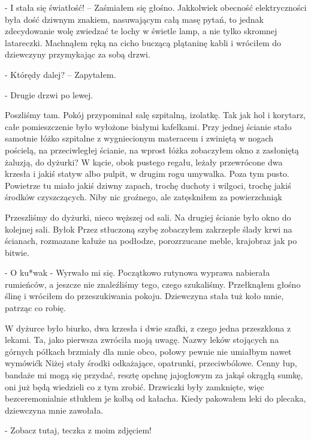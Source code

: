 \documentclass[../MAIN.tex]{subfiles}
\begin{document}
- I stała się światłość! – Zaśmiałem się głośno. Jakkolwiek obecność elektryczności była dość dziwnym znakiem, nasuwającym całą masę pytań, to jednak zdecydowanie wolę zwiedzać te lochy w świetle lamp, a nie tylko skromnej latareczki. Machnąłem ręką na cicho buczącą plątaninę kabli i wróciłem do dziewczyny przymykając za sobą drzwi.

- Którędy dalej? – Zapytałem.

- Drugie drzwi po lewej.

Poszliśmy tam. Pokój przypominał salę szpitalną, izolatkę. Tak jak hol i korytarz, całe pomieszczenie było wyłożone białymi kafelkami. Przy jednej ścianie stało samotnie łóżko szpitalne z wygniecionym materacem i zwiniętą w nogach pościelą, na przeciwległej ścianie, na wprost łóżka zobaczyłem okno z zasłoniętą żaluzją, do dyżurki? W kącie, obok pustego regału, leżały przewrócone dwa krzesła i jakiś statyw albo pulpit, w drugim rogu umywalka. Poza tym pusto. Powietrze tu miało jakiś dziwny zapach, trochę duchoty i wilgoci, trochę jakiś środków czyszczących. Niby nic groźnego, ale zatęskniłem za powierzchnią\3k

Przeszliśmy do dyżurki, nieco węższej od sali. Na drugiej ścianie było okno do kolejnej sali. Było\3k Przez stłuczoną szybę zobaczyłem zakrzepłe ślady krwi na ścianach, rozmazane kałuże na podłodze, porozrzucane meble, krajobraz jak po bitwie.

- O ku*wa\3k - Wyrwało mi się. Początkowo rutynowa wyprawa nabierała rumieńców, a jeszcze nie znaleźliśmy tego, czego szukaliśmy. Przełknąłem głośno ślinę i wróciłem do przeszukiwania pokoju. Dziewczyna stała tuż koło mnie, patrząc co robię.

W dyżurce było biurko, dwa krzesła i dwie szafki, z czego jedna przeszklona z lekami. Ta, jako pierwsza zwróciła moją uwagę. Nazwy leków stojących na górnych półkach brzmiały dla mnie obco, połowy pewnie nie umiałbym nawet wymówić\3k Niżej stały środki odkażające, opatrunki, przeciwbólowe. Cenny łup, bandaże mi mogą się przydać, resztę opchnę jajogłowym za jakąś okrągłą sumkę, oni już będą wiedzieli co z tym zrobić. Drzwiczki były zamknięte, więc bezceremonialnie stłukłem je kolbą od kałacha. Kiedy pakowałem leki do plecaka, dziewczyna mnie zawołała.

- Zobacz tutaj, teczka z moim zdjęciem!
\end{document}
